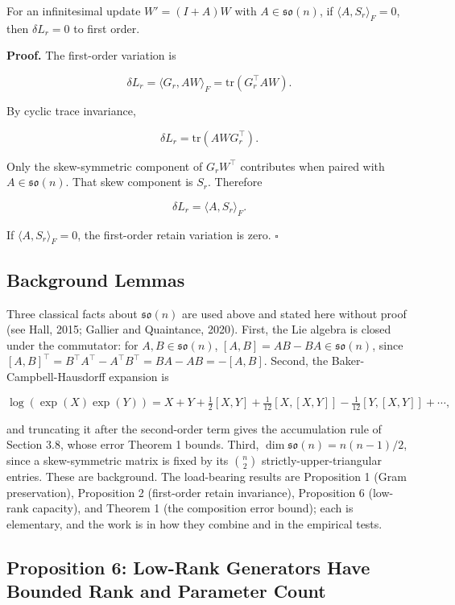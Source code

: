 \documentclass[
]{article}
\begin{document}
For an infinitesimal update \(W'=(I+A)W\) with \(A\in\mathfrak{so}(n)\), if \(\langle A,S_r\rangle_F=0\), then \(\delta L_r=0\) to first order.

\textbf{Proof.} The first-order variation is

\[
\delta L_r=\langle G_r,AW\rangle_F
=\mathrm{tr}(G_r^\top AW).
\]

By cyclic trace invariance,

\[
\delta L_r=\mathrm{tr}(AWG_r^\top).
\]

Only the skew-symmetric component of \(G_rW^\top\) contributes when paired with \(A\in\mathfrak{so}(n)\). That skew component is \(S_r\). Therefore

\[
\delta L_r=\langle A,S_r\rangle_F.
\]

If \(\langle A,S_r\rangle_F=0\), the first-order retain variation is zero. \(\square\)

\subsection{Background Lemmas}\label{background-lemmas}

Three classical facts about \(\mathfrak{so}(n)\) are used above and stated here without proof (see Hall, 2015; Gallier and Quaintance, 2020). First, the Lie algebra is closed under the commutator: for \(A,B\in\mathfrak{so}(n)\), \([A,B]=AB-BA\in\mathfrak{so}(n)\), since \([A,B]^\top=B^\top A^\top-A^\top B^\top=BA-AB=-[A,B]\). Second, the Baker-Campbell-Hausdorff expansion is

\[
\log(\exp(X)\exp(Y))
=X+Y+\tfrac{1}{2}[X,Y]
+\tfrac{1}{12}[X,[X,Y]]
-\tfrac{1}{12}[Y,[X,Y]]+\cdots,
\]

and truncating it after the second-order term gives the accumulation rule of Section 3.8, whose error Theorem 1 bounds. Third, \(\dim\mathfrak{so}(n)=n(n-1)/2\), since a skew-symmetric matrix is fixed by its \(\binom{n}{2}\) strictly-upper-triangular entries. These are background. The load-bearing results are Proposition 1 (Gram preservation), Proposition 2 (first-order retain invariance), Proposition 6 (low-rank capacity), and Theorem 1 (the composition error bound); each is elementary, and the work is in how they combine and in the empirical tests.

\subsection{Proposition 6: Low-Rank Generators Have Bounded Rank and Parameter Count}\label{proposition-6-low-rank-generators-have-bounded-rank-and-parameter-count}
\end{document}
